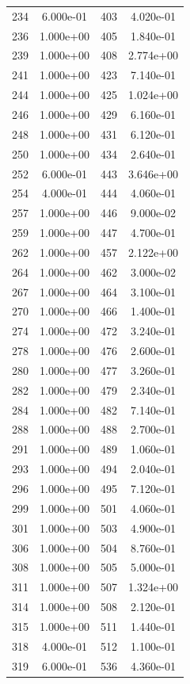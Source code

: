 \documentclass[12pt]{article}
\begin{document}
\begin{longtable}{@{}cccc@{}}
234 & 6.000e-01 & 403 & 4.020e-01 \\
236 & 1.000e+00 & 405 & 1.840e-01 \\
239 & 1.000e+00 & 408 & 2.774e+00 \\
241 & 1.000e+00 & 423 & 7.140e-01 \\
244 & 1.000e+00 & 425 & 1.024e+00 \\
246 & 1.000e+00 & 429 & 6.160e-01 \\
248 & 1.000e+00 & 431 & 6.120e-01 \\
250 & 1.000e+00 & 434 & 2.640e-01 \\
252 & 6.000e-01 & 443 & 3.646e+00 \\
254 & 4.000e-01 & 444 & 4.060e-01 \\
257 & 1.000e+00 & 446 & 9.000e-02 \\
259 & 1.000e+00 & 447 & 4.700e-01 \\
262 & 1.000e+00 & 457 & 2.122e+00 \\
264 & 1.000e+00 & 462 & 3.000e-02 \\
267 & 1.000e+00 & 464 & 3.100e-01 \\
270 & 1.000e+00 & 466 & 1.400e-01 \\
274 & 1.000e+00 & 472 & 3.240e-01 \\
278 & 1.000e+00 & 476 & 2.600e-01 \\
280 & 1.000e+00 & 477 & 3.260e-01 \\
282 & 1.000e+00 & 479 & 2.340e-01 \\
284 & 1.000e+00 & 482 & 7.140e-01 \\
288 & 1.000e+00 & 488 & 2.700e-01 \\
291 & 1.000e+00 & 489 & 1.060e-01 \\
293 & 1.000e+00 & 494 & 2.040e-01 \\
296 & 1.000e+00 & 495 & 7.120e-01 \\
299 & 1.000e+00 & 501 & 4.060e-01 \\
301 & 1.000e+00 & 503 & 4.900e-01 \\
306 & 1.000e+00 & 504 & 8.760e-01 \\
308 & 1.000e+00 & 505 & 5.000e-01 \\
311 & 1.000e+00 & 507 & 1.324e+00 \\
314 & 1.000e+00 & 508 & 2.120e-01 \\
315 & 1.000e+00 & 511 & 1.440e-01 \\
318 & 4.000e-01 & 512 & 1.100e-01 \\
319 & 6.000e-01 & 536 & 4.360e-01 \\

\end{longtable}
\end{document}
